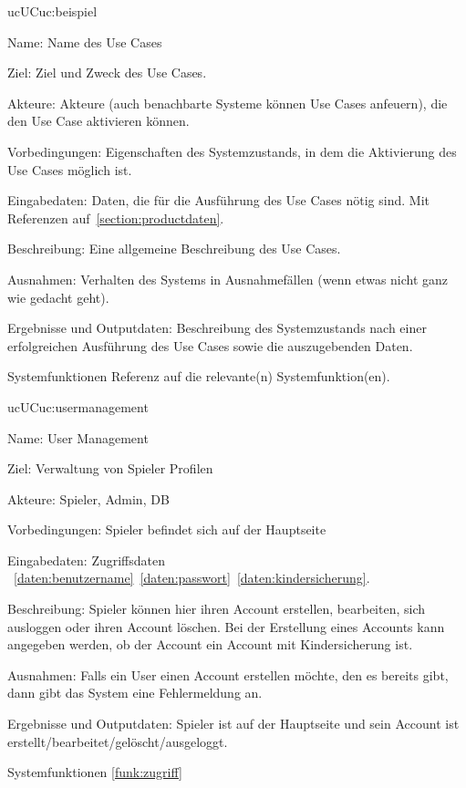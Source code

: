 \begin{description}[leftmargin=5em, style=sameline]

	\begin{lhp}{uc}{UC}{uc:beispiel}
		\item [Name:] Name des Use Cases
		\item [Ziel:] Ziel und Zweck des Use Cases.
		\item [Akteure:] Akteure (auch benachbarte Systeme können Use Cases anfeuern), die den Use Case aktivieren können.
		\item [Vorbedingungen:] Eigenschaften des Systemzustands, in dem die Aktivierung des Use Cases möglich ist.
		\item [Eingabedaten:] Daten, die für die Ausführung des Use Cases nötig sind. Mit Referenzen auf~\ref{section:productdaten}.
		\item [Beschreibung:] Eine allgemeine Beschreibung des Use Cases.
		\item [Ausnahmen:] Verhalten des Systems in Ausnahmefällen (wenn etwas nicht ganz wie gedacht geht).
		\item [Ergebnisse und Outputdaten:] Beschreibung des Systemzustands nach einer erfolgreichen Ausführung des Use Cases sowie die auszugebenden Daten.
		\item [Systemfunktionen] Referenz auf die relevante(n) Systemfunktion(en).
	\end{lhp}

	\begin{lhp}{uc}{UC}{uc:usermanagement}
		\item [Name:] User Management
		\item [Ziel:] Verwaltung von Spieler Profilen
		\item [Akteure:] Spieler, Admin, DB
		\item [Vorbedingungen:] Spieler befindet sich auf der Hauptseite
		\item [Eingabedaten:] Zugriffsdaten ~\ref{daten:benutzername}~\ref{daten:passwort}~\ref{daten:kindersicherung}.
		\item [Beschreibung:] Spieler können hier ihren Account erstellen, bearbeiten, sich ausloggen oder ihren Account löschen. Bei der Erstellung eines Accounts kann angegeben werden, ob der Account ein Account mit Kindersicherung ist.
		\item [Ausnahmen:] Falls ein User einen Account erstellen möchte, den es bereits gibt, dann gibt das System eine Fehlermeldung an. 
		\item [Ergebnisse und Outputdaten:] Spieler ist auf der Hauptseite und sein Account ist erstellt/bearbeitet/gelöscht/ausgeloggt.
		\item [Systemfunktionen] \ref{funk:zugriff}
	\end{lhp}


\end{description}
